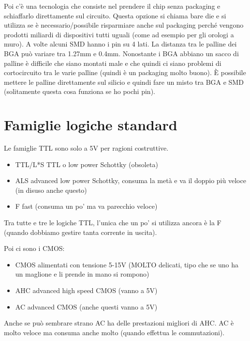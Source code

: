 \documentclass[
]{book}
\providecommand{\tightlist}{%
  \setlength{\itemsep}{0pt}\setlength{\parskip}{0pt}}
\begin{document}
Poi c'è una tecnologia che consiste nel prendere il chip senza packaging
e schiaffarlo direttamente sul circuito. Questa opzione si chiama bare
die e si utilizza se è necessario/possibile risparmiare anche sul
packaging perché vengono prodotti miliardi di dispositivi tutti uguali
(come ad esempio per gli orologi a muro). \newline A volte alcuni SMD
hanno i pin su 4 lati. \newline  La distanza tra le palline dei BGA può
variare tra 1.27mm e 0.4mm. Nonostante i BGA abbiano un sacco di palline
è difficile che siano montati male e che quindi ci siano problemi di
cortocircuito tra le varie palline (quindi è un packaging molto buono).
È possibile mettere le palline direttamente sul silicio e quindi fare un
misto tra BGA e SMD (solitamente questa cosa funziona se ho pochi pin).

\section{Famiglie logiche standard}\label{famiglie-logiche-standard}

Le famiglie TTL sono solo a 5V per ragioni costruttive.

\begin{itemize}
\tightlist
\item
  TTL/L*S TTL o low power Schottky (obsoleta)
\item
  ALS advanced low power Schottky, consuma la metà e va il doppio più
  veloce (in disuso anche questo)
\item
  F fast (consuma un po' ma va parecchio veloce)
\end{itemize}

Tra tutte e tre le logiche TTL, l'unica che un po' si utilizza ancora è
la F (quando dobbiamo gestire tanta corrente in uscita).

Poi ci sono i CMOS:

\begin{itemize}
\tightlist
\item
  CMOS alimentati con tensione 5-15V (MOLTO delicati, tipo che se uno ha
  un maglione e li prende in mano si rompono)
\item
  AHC advanced high speed CMOS (vanno a 5V)
\item
  AC advanced CMOS (anche questi vanno a 5V)
\end{itemize}

Anche se può sembrare strano AC ha delle prestazioni migliori di AHC. AC
è molto veloce ma consuma anche molto (quando effettua le commutazioni).
\end{document}
